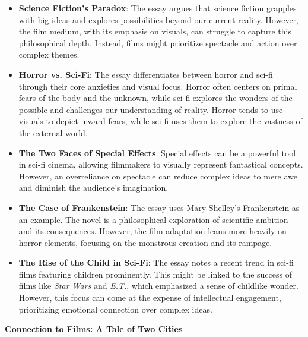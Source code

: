 \documentclass[11pt,fleqn]{book} %
\begin{document}
\begin{itemize}
\item \textbf{Science Fiction's Paradox}: The essay argues that science fiction grapples with big ideas and explores possibilities beyond our current reality. However, the film medium, with its emphasis on visuals, can struggle to capture this philosophical depth. Instead, films might prioritize spectacle and action over complex themes.

\item \textbf{Horror vs. Sci-Fi}: The essay differentiates between horror and sci-fi through their core anxieties and visual focus. Horror  often centers on primal fears of the body and the unknown, while sci-fi explores the wonders of the possible and challenges our understanding of reality. Horror tends to use visuals to depict inward fears, while sci-fi uses them to explore the vastness of the external world.

\item \textbf{The Two Faces of Special Effects}: Special effects can be a powerful tool in sci-fi cinema, allowing filmmakers to visually represent fantastical concepts. However, an overreliance on spectacle can reduce complex ideas to mere awe and diminish the audience's imagination. 

\item \textbf{The Case of Frankenstein}: The essay uses Mary Shelley's Frankenstein as an example. The novel is a philosophical exploration of scientific ambition and its consequences. However, the film adaptation leans more heavily on horror elements, focusing on the monstrous creation and its rampage.

\item \textbf{The Rise of the Child in Sci-Fi}: The essay notes a recent trend in sci-fi films featuring children prominently. This might be linked to the success of films like\textit{ Star Wars} and \textit{E.T.}, which emphasized a sense of childlike wonder. However, this focus can come at the expense of intellectual engagement, prioritizing emotional connection over complex ideas.
\end{itemize}
\vspace{5pt}
\textbf{Connection to Films: A Tale of Two Cities}
\end{document}

